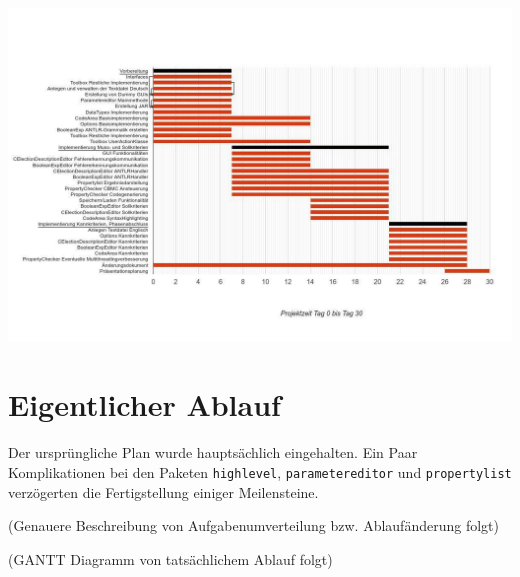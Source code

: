 \documentclass[a4paper]{scrreprt}
\begin{document}
\includegraphics[width=1.3\textwidth] {originalPlanung.jpg}

\section{Eigentlicher Ablauf}
Der ursprüngliche Plan wurde hauptsächlich eingehalten. Ein Paar Komplikationen bei den Paketen \verb!highlevel!, \verb!parametereditor! und \verb!propertylist! verzögerten die Fertigstellung einiger Meilensteine.

(Genauere Beschreibung von Aufgabenumverteilung bzw. Ablaufänderung folgt)

(GANTT Diagramm von tatsächlichem Ablauf folgt)
\end{document}
